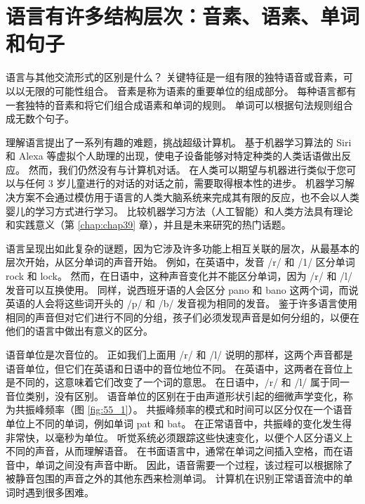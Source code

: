 \section{语言有许多结构层次：音素、语素、单词和句子}
语言与其他交流形式的区别是什么？ 关键特征是一组有限的独特语音或音素，可以以无限的可能性组合。 音素是称为语素的重要单位的组成部分。 每种语言都有一套独特的音素和将它们组合成语素和单词的规则。 单词可以根据句法规则组合成无数个句子。

理解语言提出了一系列有趣的难题，挑战超级计算机。 基于机器学习算法的 Siri 和 Alexa 等虚拟个人助理的出现，使电子设备能够对特定种类的人类话语做出反应。 然而，我们仍然没有与计算机对话。 在人类可以期望与机器进行类似于您可以与任何 3 岁儿童进行的对话的对话之前，需要取得根本性的进步。 机器学习解决方案不会通过模仿用于语言的人类大脑系统来完成其有限的反应，也不会以人类婴儿的学习方式进行学习。 比较机器学习方法（人工智能）和人类方法具有理论和实践意义（第 \ref{chap:chap39} 章），并且是未来研究的热门话题。

语言呈现出如此复杂的谜题，因为它涉及许多功能上相互关联的层次，从最基本的层次开始，从区分单词的声音开始。 例如，在英语中，发音 /r/ 和 /1/ 区分单词 rock 和 lock。 然而，在日语中，这种声音变化并不能区分单词，因为 /r/ 和 /l/ 发音可以互换使用。 同样，说西班牙语的人会区分 pano 和 bano 这两个词，而说英语的人会将这些词开头的 /p/ 和 /b/ 发音视为相同的发音。 鉴于许多语言使用相同的声音但对它们进行不同的分组，孩子们必须发现声音是如何分组的，以便在他们的语言中做出有意义的区分。

语音单位是次音位的。 正如我们上面用 /r/ 和 /l/ 说明的那样，这两个声音都是语音单位，但它们在英语和日语中的音位地位不同。 在英语中，这两者在音位上是不同的，这意味着它们改变了一个词的意思。 在日语中，/r/ 和 /l/ 属于同一音位类别，没有区别。 语音单位的区别在于由声道形状引起的细微声学变化，称为共振峰频率（图 \ref{fig:55_1}）。 共振峰频率的模式和时间可以区分仅在一个语音单位上不同的单词，例如单词 pat 和 bat。 在正常语音中，共振峰的变化发生得非常快，以毫秒为单位。 听觉系统必须跟踪这些快速变化，以便个人区分语义上不同的声音，从而理解语音。 在书面语言中，通常在单词之间插入空格，而在语音中，单词之间没有声音中断。 因此，语音需要一个过程，该过程可以根据除了被静音包围的声音之外的其他东西来检测单词。 计算机在识别正常语音流中的单词时遇到很多困难。

